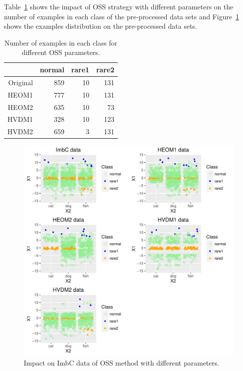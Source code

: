 \documentclass[10pt,a4paper]{article}\usepackage[]{graphicx}\usepackage[]{color}
\makeatletter
\def\maxwidth{ %
  \ifdim\Gin@nat@width>\linewidth
    \linewidth
  \else
    \Gin@nat@width
  \fi
}
\newenvironment{knitrout}{}{} %
\makeatother
\begin{document}
Table~\ref{tab:ImbC_oss_table} shows the impact of OSS strategy with different parameters on the number of examples in each class of the pre-processed data sets and Figure~\ref{fig:ImbC_oss} shows the examples distribution on the pre-processed data sets.

\begin{table}[ht]
\centering
\begin{tabular}{rrrr}
  \hline
 & normal & rare1 & rare2 \\ 
  \hline
Original & 859 &  10 & 131 \\ 
  HEOM1 & 777 &  10 & 131 \\ 
  HEOM2 & 635 &  10 &  73 \\ 
  HVDM1 & 328 &  10 & 123 \\ 
  HVDM2 & 659 &   3 & 131 \\ 
   \hline
\end{tabular}
\caption{Number of examples in each class for different OSS parameters.} 
\label{tab:ImbC_oss_table}
\end{table}


\begin{knitrout}\footnotesize
{}\color{fgcolor}\begin{figure}

{\centering \includegraphics[width=\maxwidth]{figures/UBL-ImbC_oss-1} 

}

\caption[Impact on ImbC data of OSS method with different parameters]{Impact on ImbC data of OSS method with different parameters.}\label{fig:ImbC_oss}
\end{figure}


\end{knitrout}
\end{document}
